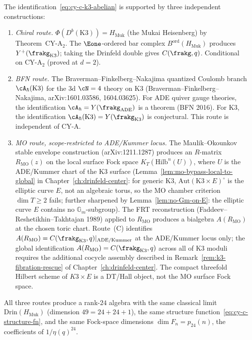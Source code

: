 \begin{remark}
\label{rem:cy-c-three-routes}
The identification~\eqref{eq:cy-c-k3-abelian} is supported by three independent constructions:
\begin{enumerate}[label=\textup{(\Alph*)}]
 \item \emph{Chiral route.} $\Phi(D^b(\mathrm{K3})) = H_{\mathrm{Muk}}$ (the Mukai Heisenberg) by Theorem~CY-A$_2$. The $\Eone$-ordered bar complex $B^{\mathrm{ord}}(H_{\mathrm{Muk}})$ produces $Y^+(\frakg_{\mathrm{K3}})$; taking the Drinfeld double gives $C(\frakg, q)$. Conditional on CY-A$_2$ (proved at $d = 2$).
 \item \emph{BFN route.} The Braverman--Finkelberg--Nakajima quantized Coulomb branch $\cA_\hbar(\mathrm{K3})$ for the 3d $\cN = 4$ theory on K3 (Braverman--Finkelberg--Nakajima, arXiv:1601.03586, 1604.03625). For ADE quiver gauge theories, the identification $\cA_\hbar = Y(\frakg_{\mathrm{ADE}})$ is a theorem (BFN 2016). For K3, the identification $\cA_\hbar(\mathrm{K3}) = Y(\frakg_{\mathrm{K3}})$ is conjectural. This route is independent of CY-A.
 \item \emph{MO route, scope-restricted to ADE/Kummer locus.} The Maulik--Okounkov stable envelope construction (arXiv:1211.1287) produces an $R$-matrix $R_{\mathrm{MO}}(z)$ on the local surface Fock space \(K_T(\mathrm{Hilb}^n(U))\), where \(U\) is the ADE/Kummer chart of the K3 surface (Lemma~\ref{lem:mo-bypass-local-to-global} in Chapter~\ref{ch:drinfeld-center}: for generic K3, $\mathrm{Aut}(\mathrm{K3} \times E)^\circ$ is the elliptic curve $E$, not an algebraic torus, so the MO chamber criterion $\dim T \geq 2$ fails; further sharpened by Lemma~\ref{lem:no-Gm-on-E}: the elliptic curve $E$ contains no $\mathbb{G}_m$-subgroup). The FRT reconstruction (Faddeev--Reshetikhin--Takhtajan 1989) applied to $R_{\mathrm{MO}}$ produces a bialgebra $A(R_{\mathrm{MO}})$ at the chosen toric chart. Route~(C) identifies $A(R_{\mathrm{MO}}) = C(\frakg_{\mathrm{K3}}, q)|_{\text{ADE/Kummer}}$ at the ADE/Kummer locus only; the global identification $A(R_{\mathrm{MO}}) = C(\frakg_{\mathrm{K3}}, q)$ across all of K3 moduli requires the additional cocycle assembly described in Remark~\ref{rem:k3-fibration-rescue} of Chapter~\ref{ch:drinfeld-center}. The compact threefold Hilbert scheme of \(K3\times E\) is a DT/Hall object, not the MO surface Fock space.
\end{enumerate}
All three routes produce a rank-$24$ algebra with the same classical
limit $\mathrm{Drin}(H_{\mathrm{Muk}})$ (dimension $49 = 24 + 24 + 1$),
the same structure function~\eqref{eq:cy-c-structure-fn}, and the same
Fock-space dimensions $\dim F_n = p_{24}(n)$, the coefficients of
$1/\eta(q)^{24}$.
\end{remark}

